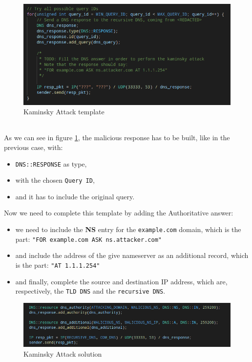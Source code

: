 \documentclass[11pt,a4paper]{article}
\begin{document}
\begin{figure}[h!]
  \includegraphics[width=\textwidth]{kaminsky-template.png}
  \caption{Kaminsky Attack template}
  \label{fig:kaminsky-attack-template}
\end{figure}

\noindent
\\
As we can see in figure \ref{fig:kaminsky-attack-template}, the malicious response has to be
built, like in the previous case, with:
\begin{itemize}
  \item \texttt{DNS::RESPONSE} as type,
  \item with the chosen \texttt{Query ID},
  \item and it has to include the original query.
\end{itemize}

\noindent
Now we need to complete this template by adding the Authoritative answer:
\begin{itemize}
  \item we need to include the \textbf{NS} entry for the \texttt{example.com} domain,
        which is the part: \texttt{"FOR example.com ASK ns.attacker.com"}
  \item and include the address of the give nameserver as an additional record, which is
        the part: \texttt{"AT 1.1.1.254"}
  \item and finally, complete the source and destination IP address, which are, respectively,
        the \texttt{TLD DNS} and the \texttt{recursive DNS}.
\end{itemize}

\begin{figure}[h!]
  \includegraphics[width=\textwidth]{kaminsky-solution.png}
  \caption{Kaminsky Attack solution}
  \label{fig:kaminsky-attack-solution}
\end{figure}
\end{document}

